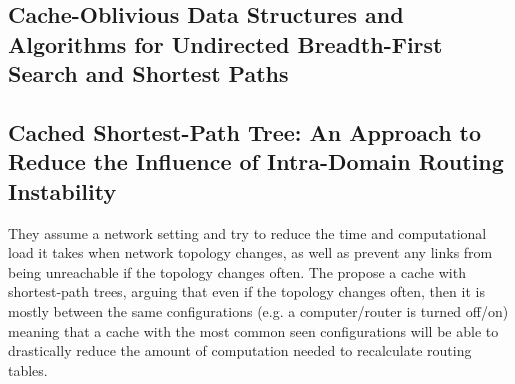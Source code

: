 \cite{pcsqm}



\subsection{Cache-Oblivious Data Structures and Algorithms for Undirected Breadth-First Search and Shortest Paths}

\cite{codsa}


\subsection{Cached Shortest-Path Tree: An Approach to Reduce the Influence of Intra-Domain Routing Instability}

They assume a network setting and try to reduce the time and computational load it takes when network topology changes, as well as prevent any links from being unreachable if the topology changes often. The propose a cache with shortest-path trees, arguing that even if the topology changes often, then it is mostly between the same configurations (e.g. a computer/router is turned off/on) meaning that a cache with the most common seen configurations will be able to drastically reduce the amount of computation needed to recalculate routing tables.

\cite{csptri}



